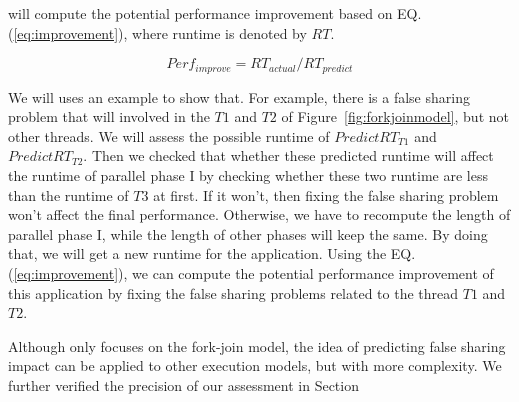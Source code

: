 \cheetah{} will compute the potential performance improvement based on EQ.(\ref{eq:improvement}), where runtime is denoted by $RT$.

\begin{equation}
\label{eq:improvement}
Perf_{improve}=RT_{actual}/RT_{predict}
\end{equation}

We will uses an example to show that. For example, there is a false sharing problem that will involved in the $T1$ and $T2$ of Figure~\ref{fig:forkjoinmodel}, but not other threads.  We will assess the possible runtime of $PredictRT_{T1}$ and $PredictRT_{T2}$. Then we checked that whether these predicted runtime will affect the runtime of parallel phase I by checking whether these two runtime are less than the runtime of $T3$ at first. If it won't, then fixing the false sharing problem won't affect the final performance. 
Otherwise, we have to recompute the length of parallel phase I, while the length of other phases will keep the same. By doing that, we will get a new runtime for the application. Using the EQ.(\ref{eq:improvement}), we can compute the potential performance improvement of this application by fixing the false sharing problems related to the thread $T1$ and $T2$. 

Although  \cheetah{} only focuses on the fork-join model, the idea of predicting false sharing impact can be applied to other execution models, but with more complexity. We further verified the precision of our assessment in Section~\ 








